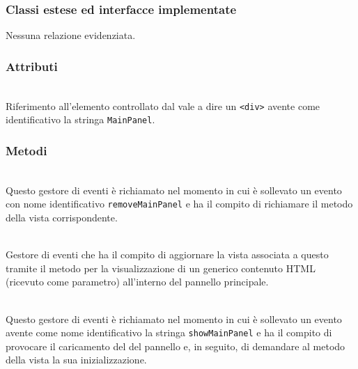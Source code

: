 \subsubsection*{Classi estese ed interfacce implementate}
Nessuna relazione evidenziata.

\subsubsection*{Attributi}
\begin{description}
\item{}\\
  Riferimento all'elemento controllato dal  vale a dire un \verb'<div>' avente come identificativo la stringa \verb'MainPanel'.
\end{description}

\subsubsection*{Metodi}
\begin{description}

  \item{}\\
  Questo gestore di eventi è richiamato nel momento in cui è sollevato un evento con nome identificativo \texttt{removeMainPanel} e ha il compito di richiamare il metodo  della vista corrispondente.
  
  \item{}\\
  Gestore di eventi che ha il compito di aggiornare la vista associata a questo  tramite il metodo  per la visualizzazione di un generico contenuto HTML (ricevuto come parametro) all'interno del pannello principale.
  
  \item{}\\
  Questo gestore di eventi è richiamato nel momento in cui è sollevato un evento avente come nome identificativo la stringa \texttt{showMainPanel} e ha il compito di provocare il caricamento del  del pannello e, in seguito, di demandare al metodo  della vista la sua inizializzazione.

\end{description}


